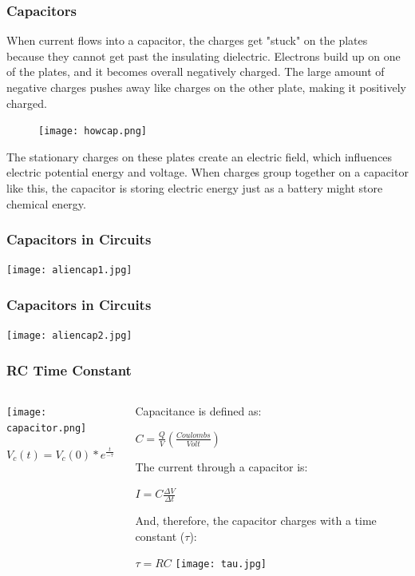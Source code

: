 \documentclass{beamer}
\begin{document}
\begin{frame}\frametitle{Capacitors}
When current flows into a capacitor, the charges get "stuck" on the plates because they cannot get past the insulating dielectric. Electrons build up on one of the plates, and it becomes overall negatively charged. The large amount of negative charges pushes away like charges on the other plate, making it positively charged.
\begin{figure}
\texttt{[image: howcap.png]} 
\end{figure}
The stationary charges on these plates create an electric field, which influences electric potential energy and voltage. When charges group together on a capacitor like this, the capacitor is storing electric energy just as a battery might store chemical energy.
\end{frame}

\begin{frame}\frametitle{Capacitors in Circuits}
\begin{center}
\texttt{[image: aliencap1.jpg]}
\end{center}
\end{frame}

\begin{frame}\frametitle{Capacitors in Circuits}
\begin{center}
\texttt{[image: aliencap2.jpg]}
\end{center}
\end{frame}

\begin{frame}\frametitle{RC Time Constant}
\begin{columns}
\begin{column}{4cm}
\begin{center}
\texttt{[image: capacitor.png]}

$V_{c}(t) = V_{c}(0) * e^{\frac{t}{-\tau}}$
\end{center}
\end{column}
\begin{column}{7cm}
Capacitance is defined as:
\begin{center}
$C = \frac{Q}{V} (\frac{Coulombs}{Volt})$ 
\end{center}

The current through a capacitor is:
\begin{center}
$I = C \frac{\Delta V}{\Delta t}$
\end{center}

And, therefore, the capacitor charges with a time constant ($\tau$):
\begin{center}
$ \tau = RC $
\texttt{[image: tau.jpg]}
\end{center}
\end{column}
\end{columns}
\end{frame}
\end{document}
